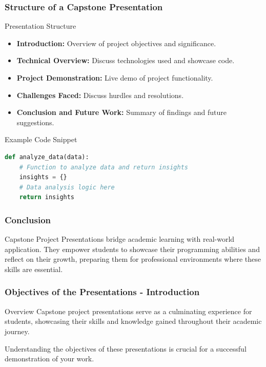 \documentclass{beamer}
\begin{document}
\begin{frame}[fragile]
    \frametitle{Structure of a Capstone Presentation}

    \begin{block}{Presentation Structure}
        \begin{itemize}
            \item \textbf{Introduction:} Overview of project objectives and significance.
            \item \textbf{Technical Overview:} Discuss technologies used and showcase code.
            \item \textbf{Project Demonstration:} Live demo of project functionality.
            \item \textbf{Challenges Faced:} Discuss hurdles and resolutions.
            \item \textbf{Conclusion and Future Work:} Summary of findings and future suggestions. 
        \end{itemize}
    \end{block}

    \begin{block}{Example Code Snippet}
    \begin{lstlisting}[language=Python]
def analyze_data(data):
    # Function to analyze data and return insights
    insights = {}
    # Data analysis logic here
    return insights
    \end{lstlisting}
    \end{block}
    
\end{frame}

\begin{frame}[fragile]
    \frametitle{Conclusion}

    Capstone Project Presentations bridge academic learning with real-world application. They empower students to showcase their programming abilities and reflect on their growth, preparing them for professional environments where these skills are essential.

\end{frame}

\begin{frame}[fragile]
    \frametitle{Objectives of the Presentations - Introduction}
    \begin{block}{Overview}
        Capstone project presentations serve as a culminating experience for students, showcasing their skills and knowledge gained throughout their academic journey.
    \end{block}
    Understanding the objectives of these presentations is crucial for a successful demonstration of your work.
\end{frame}
\end{document}
